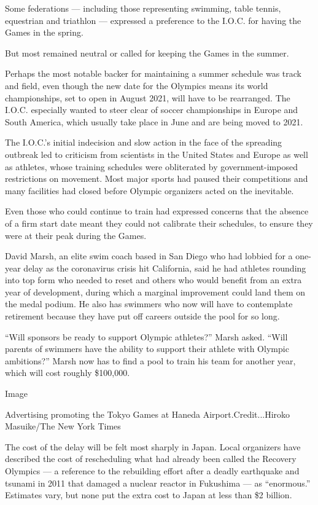 Some federations --- including those representing swimming, table
tennis, equestrian and triathlon --- expressed a preference to the
I.O.C. for having the Games in the spring.

But most remained neutral or called for keeping the Games in the summer.

Perhaps the most notable backer for maintaining a summer schedule was
track and field, even though the new date for the Olympics means its
world championships, set to open in August 2021, will have to be
rearranged. The I.O.C. especially wanted to steer clear of soccer
championships in Europe and South America, which usually take place in
June and are being moved to 2021.

The I.O.C.'s initial indecision and slow action in the face of the
spreading outbreak led to criticism from scientists in the United States
and Europe as well as athletes, whose training schedules were
obliterated by government-imposed restrictions on movement. Most major
sports had paused their competitions and many facilities had closed
before Olympic organizers acted on the inevitable.

Even those who could continue to train had expressed concerns that the
absence of a firm start date meant they could not calibrate their
schedules, to ensure they were at their peak during the Games.

David Marsh, an elite swim coach based in San Diego who had lobbied for
a one-year delay as the coronavirus crisis hit California, said he had
athletes rounding into top form who needed to reset and others who would
benefit from an extra year of development, during which a marginal
improvement could land them on the medal podium. He also has swimmers
who now will have to contemplate retirement because they have put off
careers outside the pool for so long.

``Will sponsors be ready to support Olympic athletes?'' Marsh asked.
``Will parents of swimmers have the ability to support their athlete
with Olympic ambitions?'' Marsh now has to find a pool to train his team
for another year, which will cost roughly \$100,000.

Image

Advertising promoting the Tokyo Games at Haneda Airport.Credit...Hiroko
Masuike/The New York Times

The cost of the delay will be felt most sharply in Japan. Local
organizers have described the cost of rescheduling what had already been
called the Recovery Olympics --- a reference to the rebuilding effort
after a deadly earthquake and tsunami in 2011 that damaged a nuclear
reactor in Fukushima --- as ``enormous.'' Estimates vary, but none put
the extra cost to Japan at less than \$2 billion.

